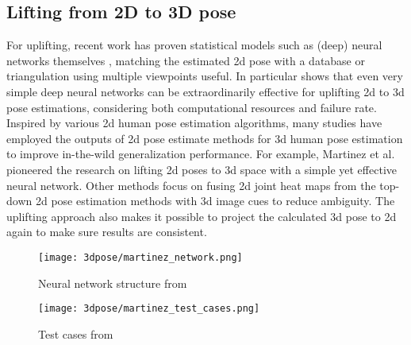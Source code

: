 \subsection{Lifting from 2D to 3D pose}
For uplifting, recent work has proven statistical models such as (deep) neural networks themselves \cite{Tome_2017_CVPR, Martinez_2017_ICCV}, matching the estimated 2d pose with a database \cite{Chen_2017_CVPR} or triangulation using multiple viewpoints \cite{Dong_2019_CVPR} useful. In particular \cite{Martinez_2017_ICCV} shows that even very simple deep neural networks can be extraordinarily effective for uplifting 2d to 3d pose estimations, considering both computational resources and failure rate.
\newline
Inspired by various 2d human pose estimation algorithms, many studies have employed the outputs of 2d pose estimate methods for 3d human pose estimation to improve in-the-wild generalization performance. For example, Martinez et al. \cite{Martinez_2017_ICCV} pioneered the research on lifting 2d poses to 3d space with a simple yet effective neural network. Other methods \cite{park_3d_2016, wang_deep_2021, zhou_hemlets_2019, habibie_wild_2019, tekin_learning_2017} focus on fusing 2d joint heat maps from the top-down 2d pose estimation methods with 3d image cues to reduce ambiguity. The uplifting approach also makes it possible to project the calculated 3d pose to 2d again to make sure results are consistent. \cite{wang_deep_2021} 

\begin{figure*}[!htb]
	\centering
	\texttt{[image: 3dpose/martinez\_network.png]}
	\caption{Neural network structure from \cite{Martinez_2017_ICCV}}
	\label{fig:martinez-network}
\end{figure*}

\begin{figure*}[!htb]
	\centering
	\texttt{[image: 3dpose/martinez\_test\_cases.png]}
	\caption{Test cases from \cite{Martinez_2017_ICCV}}
	\label{fig:martinez-test-cases}
\end{figure*}

